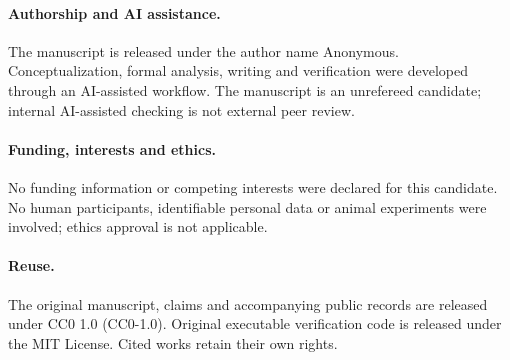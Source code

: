 \documentclass[11pt]{article}
\theoremstyle{definition}
\theoremstyle{remark}
\begin{document}
\paragraph{Authorship and AI assistance.}
The manuscript is released under the author name Anonymous. Conceptualization,
formal analysis, writing and verification were developed through an
AI-assisted workflow. The manuscript is an unrefereed candidate; internal
AI-assisted checking is not external peer review.

\paragraph{Funding, interests and ethics.}
No funding information or competing interests were declared for this
candidate. No human participants, identifiable personal data or animal
experiments were involved; ethics approval is not applicable.

\paragraph{Reuse.}
The original manuscript, claims and accompanying public records are released
under CC0 1.0 (CC0-1.0). Original executable verification code is released
under the MIT License. Cited works retain their own rights.
\end{document}
